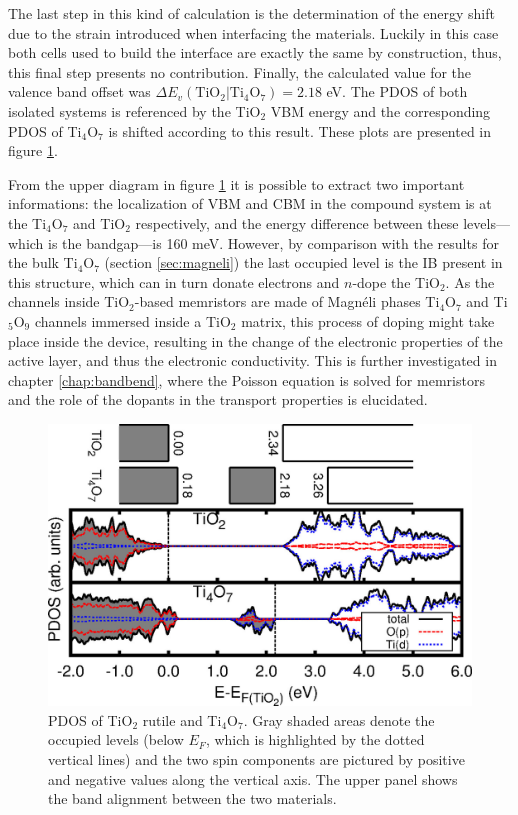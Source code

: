 The last step in this kind of calculation is the determination of the energy shift due to the strain introduced when interfacing the materials. Luckily in this case both cells used to build the interface are exactly the same by construction, thus, this final step presents no contribution. Finally, the calculated value for the valence band offset was $\Delta E_v (\text{TiO}_2|\text{Ti}_4\text{O}_7) = 2.18$ eV. The PDOS of both isolated systems is referenced by the TiO$_2$ VBM energy and the corresponding PDOS of Ti$_4$O$_7$ is shifted according to this result. These plots are presented in figure \ref{fig:pdos-bo}.

From the upper diagram in figure \ref{fig:pdos-bo} it is possible to extract two important informations: the localization of VBM and CBM in the compound system is at the Ti$_4$O$_7$ and TiO$_2$ respectively, and the energy difference between these levels---which is the bandgap---is 160 meV. However, by comparison with the results for the bulk Ti$_4$O$_7$ (section \ref{sec:magneli}) the last occupied level is the IB present in this structure, which can in turn donate electrons and $n$-dope the TiO$_2$. As the channels inside TiO$_2$-based memristors are made of Magnéli phases Ti$_4$O$_7$ and Ti$_5$O$_9$ channels immersed inside a TiO$_2$ matrix, this process of doping might take place inside the device, resulting in the change of the electronic properties of the active layer, and thus the electronic conductivity. This is further investigated in chapter \ref{chap:bandbend}, where the Poisson equation is solved for memristors and the role of the dopants in the transport properties is elucidated.

\begin{center}
 \begin{figure}[ht!]
  \begin{center}
   \includegraphics[width=0.8\columnwidth]{img/pdos-bo.jpg}
   \caption{PDOS of TiO${}_2$ rutile and Ti${}_4$O${}_7$. Gray shaded areas denote the occupied levels (below $E_F$, which is highlighted by the dotted vertical lines) and the two spin components are pictured by positive and negative values along the vertical axis. The upper panel shows the band alignment between the two materials.}
   \label{fig:pdos-bo} 
  \end{center}
 \end{figure}
\end{center}

